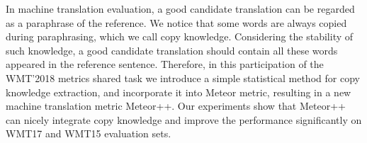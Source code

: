 In machine translation evaluation, a good candidate translation can be regarded as a paraphrase of the reference. We notice that some words are always copied during paraphrasing, which we call copy knowledge. Considering the stability of such knowledge, a good candidate translation should contain all these words appeared in the reference sentence. Therefore, in this participation of the WMT'2018 metrics shared task we introduce a simple statistical method for copy knowledge extraction, and incorporate it into Meteor metric, resulting in a new machine translation metric Meteor++. Our experiments show that Meteor++ can nicely integrate copy knowledge and improve the performance significantly on WMT17 and WMT15 evaluation sets.

